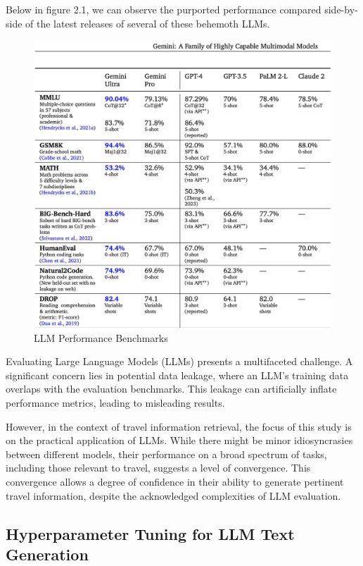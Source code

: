 \documentclass[12pt,a4paper]{report}
\begin{document}
Below in figure 2.1, we can observe the purported performance compared side-by-side of the latest releases of several of these behemoth LLMs.

\begin{figure}[h]
    \centering
    \includegraphics[scale=.8]{llmperformancechart}
    \caption{LLM Performance Benchmarks\citep{geminireport}}
\end{figure}

Evaluating Large Language Models (LLMs) presents a multifaceted challenge.  A significant concern lies in potential data leakage, where an LLM's training data overlaps with the evaluation benchmarks. This leakage can artificially inflate performance metrics, leading to misleading results.

However, in the context of travel information retrieval, the focus of this study is on the practical application of LLMs. While there might be minor idiosyncrasies between different models, their performance on a broad spectrum of tasks, including those relevant to travel, suggests a level of convergence. This convergence allows a degree of confidence in their ability to generate pertinent travel information, despite the acknowledged complexities of LLM evaluation.

\subsection{Hyperparameter Tuning for LLM Text Generation}
\end{document}
